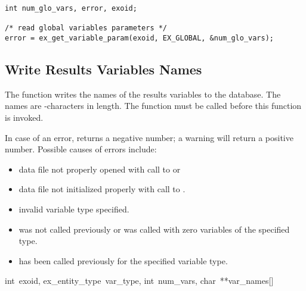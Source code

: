 \begin{lstlisting}
int num_glo_vars, error, exoid;

/* read global variables parameters */
error = ex_get_variable_param(exoid, EX_GLOBAL, &num_glo_vars);
\end{lstlisting}

\subsection{Write Results Variables Names}

The function  writes the names of the
results variables to the database. The names are
-characters in length. The function
 must be called before this function is
invoked.

In case of an error,  returns a negative
number; a warning will return a positive number.  Possible causes of
errors include:

\begin{itemize}
 \item data file not properly opened with call to 
 or 

 \item data file not initialized properly with call to .

 \item invalid variable type specified.

 \item {} was not called previously or was
 called with zero variables of the specified type.

 \item {} has been called previously for the
 specified variable type.
\end{itemize}

{int~exoid, 
ex_entity_type~var_type, 
int~num_vars, 
char~**var_names[]}

